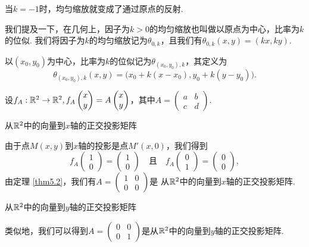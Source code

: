 \begin{remark}
  当$k=-1$时，均匀缩放就变成了通过原点的反射.
\end{remark}

我们提及一下，在几何上，因子为$k>0$的均匀缩放也叫做以原点为中心，比率为$k$的位似. 我们将因子为$k$的均匀缩放记为$\theta_{0,k} $，且我们有$\theta_{0,k}(x,y)=(kx,ky)$.

以$(x_0,y_0)$为中心，比率为$k$的位似记为$\theta_{(x_0,y_0),k}$，其定义为
\[
  \theta_{(x_0,y_0),k} (x,y) = \big( x_0 + k(x - x_0), y_0 + k(y - y_0) \big).
\]

设$f_A:\mathbb R^2\to\mathbb R^2,f_A\begin{pmatrix}
  x \\ y
\end{pmatrix}=A\begin{pmatrix}
  x \\ y
\end{pmatrix}$，其中$A=\begin{pmatrix}
  a & b \\
  c & d
\end{pmatrix}$.

{\noindent \kaishu 从$\mathbb R^2$中的向量到$x$轴的正交投影矩阵}

由于点$M(x,y)$到$x$轴的投影是点$M'(x,0)$，我们得到
\[
  f_A \begin{pmatrix}
    1 \\
    0
  \end{pmatrix} = \begin{pmatrix}
    1 \\
    0
  \end{pmatrix} \quad \text{且} \quad
  f_A \begin{pmatrix}
    0 \\
    1
  \end{pmatrix} = \begin{pmatrix}
    0 \\
    0
  \end{pmatrix},
\]
由定理 \ref{thm5.2}，我们有$A=\begin{pmatrix}
  1 & 0 \\
  0 & 0
\end{pmatrix}$是 从$\mathbb R^2$中的向量到$x$轴的正交投影矩阵. 

{\noindent\kaishu 从$\mathbb R^2$中的向量到$y$轴的正交投影矩阵}

类似地，我们可以得到$A=\begin{pmatrix}
  0 & 0 \\
  0 & 1
\end{pmatrix}$是从$\mathbb R^2$中的向量到$y$轴的正交投影矩阵.

